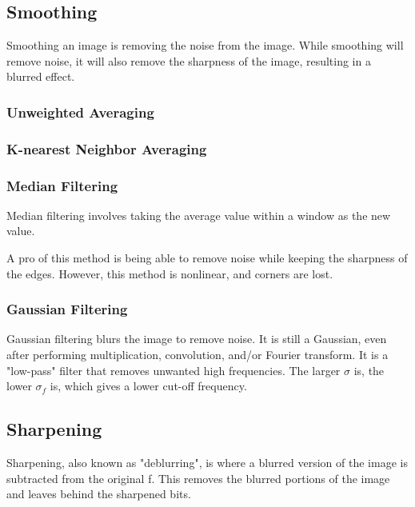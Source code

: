 \documentclass{article}
\begin{document}
\begin{multicols}{2}
\subsection{Smoothing}

Smoothing an image is removing the noise from the image. While smoothing will remove noise, it will also remove the sharpness of the image, resulting in a blurred effect.

\subsubsection{Unweighted Averaging}



\subsubsection{K-nearest Neighbor Averaging}



\subsubsection{Median Filtering}

Median filtering involves taking the average value within a window as the new value.


A pro of this method is being able to remove noise while keeping the sharpness of the edges. However, this method is nonlinear, and corners are lost.


\subsubsection{Gaussian Filtering}

Gaussian filtering blurs the image to remove noise. It is still a Gaussian, even after performing multiplication, convolution, and/or Fourier transform. It is a "low-pass" filter that removes unwanted high frequencies. The larger $\sigma$ is, the lower $\sigma_f$ is, which gives a lower cut-off frequency.

\subsection{Sharpening}

Sharpening, also known as "deblurring", is where a blurred version of the image is subtracted from the original f. This removes the blurred portions of the image and leaves behind the sharpened bits.


\end{multicols}
\end{document}
